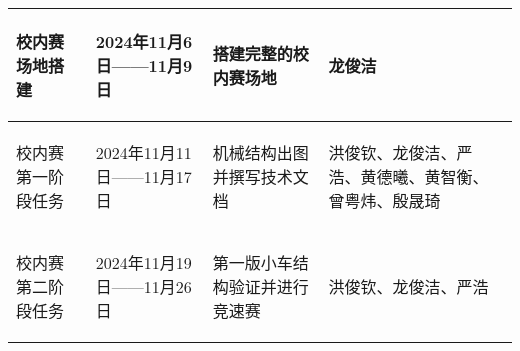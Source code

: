 \begin{longtable}{ p{1.5cm} | p{3cm} | p{6cm} | p{4.3cm} |}
       \begin{center}
           校内赛场地搭建
       \end{center} &
       \begin{center}
           2024年11月6日——11月9日
       \end{center} &
       \begin{center}
           搭建完整的校内赛场地
       \end{center} &
       \begin{center}
           龙俊洁
       \end{center} \\
        
    \hline
    
        \begin{center}
            校内赛第一阶段任务
        \end{center}&
        \begin{center}
            2024年11月11日——11月17日
        \end{center}&
        \begin{center}
            机械结构出图并撰写技术文档
        \end{center}&
        \begin{center}
            洪俊钦、龙俊洁、严浩、黄德曦、黄智衡、曾粤炜、殷晟琦
        \end{center}\\

    \hline
    

       \begin{center}
           校内赛第二阶段任务
       \end{center} &
       \begin{center}
           2024年11月19日——11月26日
       \end{center} &
       \begin{center}
           第一版小车结构验证并进行竞速赛
       \end{center} &
       \begin{center}
           洪俊钦、龙俊洁、严浩
       \end{center} \\


\end{longtable}
